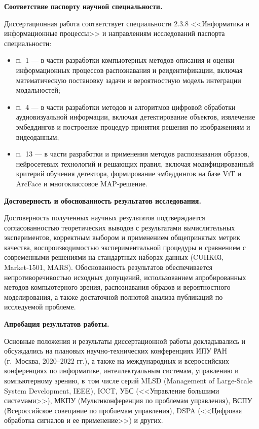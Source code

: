 \textbf{Соответствие паспорту научной специальности.}

Диссертационная работа соответствует специальности 2.3.8 <<Информатика
и информационные процессы>> и направлениям исследований паспорта специальности:
\begin{itemize}
    \item п.~1 --- в части разработки компьютерных методов описания и оценки
    информационных процессов распознавания и реидентификации, включая
    математическую постановку задачи и вероятностную модель интеграции
    модальностей;

    \item п.~4 --- в части разработки методов и алгоритмов цифровой обработки
    аудиовизуальной информации, включая детектирование объектов, извлечение
    эмбеддингов и построение процедур принятия решения по изображениям
    и видеоданным;

    \item п.~13 --- в части разработки и применения методов распознавания
    образов, нейросетевых технологий и решающих правил, включая
    модифицированный критерий обучения детектора, формирование эмбеддингов
    на базе ViT и ArcFace и многоклассовое MAP‑решение.
\end{itemize}

\textbf{Достоверность и обоснованность результатов исследования.}

Достоверность полученных научных результатов подтверждается согласованностью
теоретических выводов с результатами вычислительных экспериментов, корректным
выбором и применением общепринятых метрик качества, воспроизводимостью
экспериментальной процедуры и сравнением с современными решениями на
стандартных наборах данных (CUHK03, Market‑1501, MARS). Обоснованность
результатов обеспечивается непротиворечивостью исходных допущений, использованием
апробированных методов компьютерного зрения, распознавания образов и
вероятностного моделирования, а также достаточной полнотой анализа публикаций
по исследуемой проблеме.

\textbf{Апробация результатов работы.}

Основные положения и результаты диссертационной работы докладывались и
обсуждались на плановых научно‑технических конференциях ИПУ РАН
(г.~Москва, 2020--2022 гг.), а также на международных и всероссийских
конференциях по информатике, интеллектуальным системам, управлению и
компьютерному зрению, в~том числе серий MLSD (Management of Large‑Scale
System Development, IEEE), ICCT, УБС (<<Управление большими системами>>),
МКПУ (Мультиконференция по проблемам управления), ВСПУ (Всероссийское
совещание по проблемам управления), DSPA (<<Цифровая обработка сигналов
и ее применение>>) и других.

